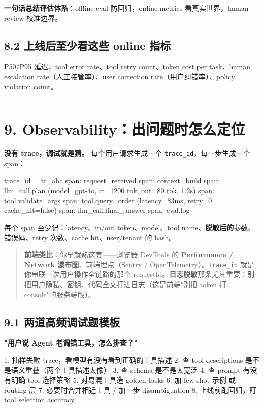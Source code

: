 \textbf{一句话总结评估体系}：offline eval 防回归，online metrics 看真实世界，human review 校准边界。

\subsection{8.2 上线后至少看这些 online 指标}

P50/P95 延迟、tool error rate、tool retry count、token cost per task、human escalation rate（人工接管率）、user correction rate（用户纠错率）、policy violation count。

\bigskip\hrule\bigskip

\section{9. Observability：出问题时怎么定位}

\textbf{没有 trace，调试就是猜。} 每个用户请求生成一个 \texttt{trace\_id}，每一步生成一个 span：

\begin{codeblock}
trace_id = tr_abc
  span: request_received
  span: context_build
  span: llm_call.plan         (model=gpt-4o, in=1200 tok, out=80 tok, 1.2s)
  span: tool.validate_args
  span: tool.query_order      (latency=83ms, retry=0, cache_hit=false)
  span: llm_call.final_answer
  span: eval.log
\end{codeblock}

每个 span 至少记：latency、in/out token、model、tool name、\textbf{脱敏后的}参数、错误码、retry 次数、cache hit、user/tenant 的 hash。

\begin{quote}
 \textbf{前端类比}：你早就熟这套——浏览器 DevTools 的 \textbf{Performance / Network 瀑布图}、前端埋点（Sentry / OpenTelemetry）。\texttt{trace\_id} 就是你串联一次用户操作全链路的那个 requestId。\textbf{日志脱敏}那条尤其重要：别把用户隐私、密钥、代码全文打进日志（这是前端"别把 token 打 console"的服务端版）。
\end{quote}

\subsection{9.1 两道高频调试题模板}

\textbf{"用户说 Agent 老调错工具，怎么排查？"}

\begin{codeblock}
1. 抽样失败 trace，看模型有没有看到正确的工具描述
2. 查 tool descriptions 是不是语义重叠（两个工具描述太像）
3. 查 schema 是不是太宽泛
4. 查 prompt 有没有明确 tool 选择策略
5. 对易混工具造 golden tasks
6. 加 few-shot 示例 或 routing 层
7. 必要时合并相近工具 / 加一步 disambiguation
8. 上线前跑回归，盯 tool selection accuracy
\end{codeblock}

